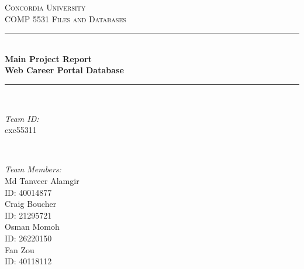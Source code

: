 \documentclass[11pt]{article}
\begin{document}
\begin{titlepage}

\newcommand{\HRule}{\rule{\linewidth}{0.5mm}} %

\center %
 

\textsc{\LARGE Concordia University}\\[1.5cm] %
\textsc{\Large COMP 5531 Files and Databases}\\[0.5cm] %


\HRule \\[0.4cm]
{ \huge \bfseries Main Project Report \\ Web Career Portal Database}\\[0.4cm] %
\HRule \\[1.5cm]
 

\begin{minipage}{0.4\textwidth}
\begin{flushleft} \large
\emph{Team ID:} \\ cxc55311 \\
\end{flushleft}
\end{minipage}
~
\begin{minipage}{0.4\textwidth}
\begin{flushright} \large
\emph{Team Members:} \\
Md Tanveer Alamgir \\ ID: 40014877\\
Craig Boucher \\ ID: 21295721 \\
Osman Momoh \\ ID: 26220150\\
Fan Zou \\ ID: 40118112\\


\end{flushright}
\end{minipage}
\end{titlepage}
\end{document}
